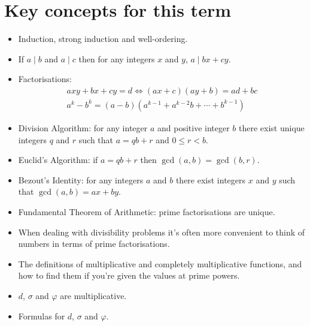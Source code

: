 \documentclass{article}
\begin{document}
\section{Key concepts for this term}
  \begin{itemize}
    \item Induction, strong induction and well-ordering.
    \item If $a\mid b$ and $a\mid c$ then for any integers $x$ and $y$, $a\mid
      bx+cy$.
    \item Factorisations:
        \begin{align*}
          axy+bx+cy=d\iff (ax+c)(ay+b)=ad+bc \\
          a^k-b^k=(a-b)\left(a^{k-1}+a^{k-2}b+\cdots+b^{k-1}\right)
        \end{align*}
    \item Division Algorithm: for any integer $a$ and positive integer $b$ there
      exist unique integers $q$ and $r$ such that $a=qb+r$ and $0\le r<b$.
    \item Euclid's Algorithm: if $a=qb+r$ then $\gcd(a,b)=\gcd(b,r)$.
    \item Bezout's Identity: for any integers $a$ and $b$ there exist integers
      $x$ and $y$ such that $\gcd(a,b)=ax+by$.
    \item Fundamental Theorem of Arithmetic: prime factorisations are unique.
    \item When dealing with divisibility problems it's often more convenient to
      think of numbers in terms of prime factorisations.
    \item The definitions of multiplicative and completely multiplicative
      functions, and how to find them if you're given the values at prime
      powers.
    \item $d$, $\sigma$ and $\varphi$ are multiplicative.
    \item Formulas for $d$, $\sigma$ and $\varphi$.
  \end{itemize}
\end{document}
